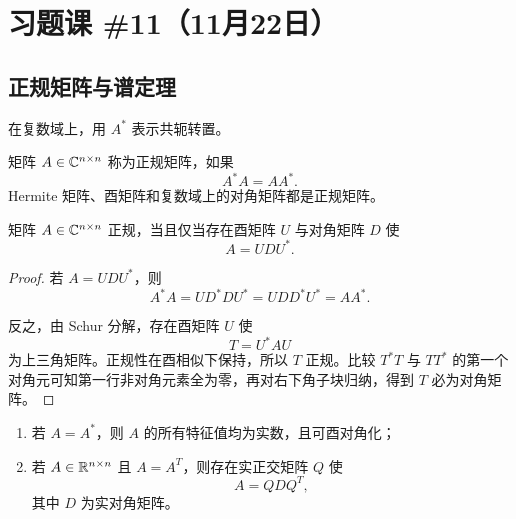 \section{习题课 \#11（11月22日）}

\subsection{正规矩阵与谱定理}

在复数域上，用 $A^*$ 表示共轭转置。

\begin{definition}
矩阵 $A\in\mathbb C^{n\times n}$ 称为正规矩阵，如果
\begin{equation}
 A^*A=AA^*.
\end{equation}
Hermite 矩阵、酉矩阵和复数域上的对角矩阵都是正规矩阵。
\end{definition}

\begin{theorem}[正规矩阵谱定理]
矩阵 $A\in\mathbb C^{n\times n}$ 正规，当且仅当存在酉矩阵 $U$ 与对角矩阵 $D$ 使
\begin{equation}
 A=UDU^*.
\end{equation}
\end{theorem}

\begin{proof}
若 $A=UDU^*$，则
\begin{equation}
 A^*A=U D^*D U^*=U DD^*U^*=AA^*.
\end{equation}

反之，由 Schur 分解，存在酉矩阵 $U$ 使
\begin{equation}
 T=U^*AU
\end{equation}
为上三角矩阵。正规性在酉相似下保持，所以 $T$ 正规。比较 $T^*T$ 与 $TT^*$ 的第一个对角元可知第一行非对角元素全为零，再对右下角子块归纳，得到 $T$ 必为对角矩阵。
\end{proof}

\begin{corollary}
\begin{enumerate}
  \item 若 $A=A^*$，则 $A$ 的所有特征值均为实数，且可酉对角化；
  \item 若 $A\in\mathbb R^{n\times n}$ 且 $A=A^T$，则存在实正交矩阵 $Q$ 使
  \begin{equation}
   A=QDQ^T,
  \end{equation}
  其中 $D$ 为实对角矩阵。
\end{enumerate}
\end{corollary}

